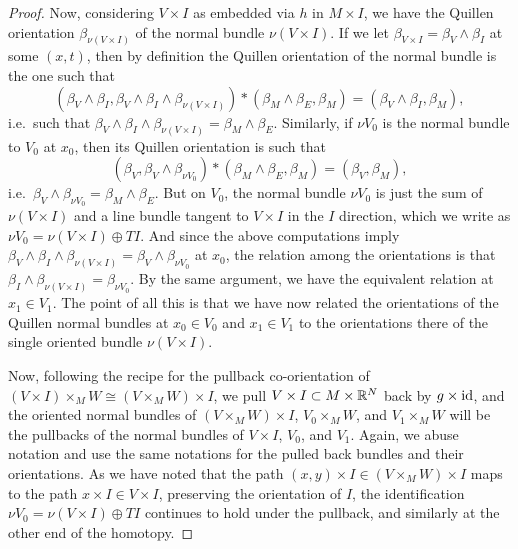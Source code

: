 \begin{proof}
	Now, considering $V \times I$ as embedded via $h$ in $M \times I$, we have the Quillen orientation $\beta_{\nu(V \times I)}$ of the normal bundle $\nu(V \times I)$.
	If we let $\beta_{V \times I} = \beta_V \wedge \beta_I$ at some $(x,t)$, then by definition the Quillen orientation of the normal bundle is the one such that
	\[
	(\beta_V \wedge \beta_I, \beta_V \wedge \beta_I \wedge \beta_{\nu(V \times I)}) * (\beta_M\wedge \beta_E,\beta_M) =
	(\beta_V\wedge \beta_I,\beta_M),
	\]
	i.e.\ such that $\beta_V \wedge \beta_I \wedge \beta_{\nu(V \times I)} = \beta_M \wedge \beta_E$.
	Similarly, if $\nu V_0$ is the normal bundle to $V_0$ at $x_0$, then its Quillen orientation is such that
	\[
	(\beta_V, \beta_V \wedge \beta_{\nu V_0})*(\beta_M \wedge \beta_E,\beta_M) =
	(\beta_V, \beta_M),
	\]
	i.e.\  $\beta_V \wedge \beta_{\nu V_0} = \beta_M \wedge \beta_E$.
	But on $V_0$, the normal bundle $\nu V_0$ is just the sum of $\nu(V \times I)$ and a line bundle tangent to $V \times I$ in the $I$ direction, which we write as $\nu V_0 = \nu(V \times I) \oplus TI$.
	And since the above computations imply $\beta_V \wedge \beta_I \wedge \beta_{\nu(V \times I)} = \beta_V \wedge \beta_{\nu V_0}$ at $x_0$, the relation among the orientations is that $\beta_I \wedge \beta_{\nu(V \times I)} = \beta_{\nu V_0}$.
	By the same argument, we have the equivalent relation at $x_1 \in V_1$.
	The point of all this is that we have now related the orientations of the Quillen normal bundles at $x_0 \in V_0$ and $x_1 \in V_1$ to the orientations there of the single oriented bundle $\nu(V \times I)$.

	Now, following the recipe for the pullback co-orientation of $(V \times I) \times_M W \cong (V \times_M W) \times I$, we pull $V \times I \subset M \times \mathbb{R}^N$ back by $g \times \mathrm{id}$, and the oriented normal bundles of $(V \times_M W) \times I$, $V_0 \times_M W$, and $V_1 \times_M W$ will be the pullbacks of the normal bundles of $V \times I$, $V_0$, and $V_1$.
	Again, we abuse notation and use the same notations for the pulled back bundles and their orientations.
	As we have noted that the path $(x,y) \times I \in (V \times_M W) \times I$ maps to the path $x \times I \in V \times I$, preserving the orientation of $I$, the identification $\nu V_0 = \nu(V \times I) \oplus TI$ continues to hold under the pullback, and similarly at the other end of the homotopy.


\end{proof}
